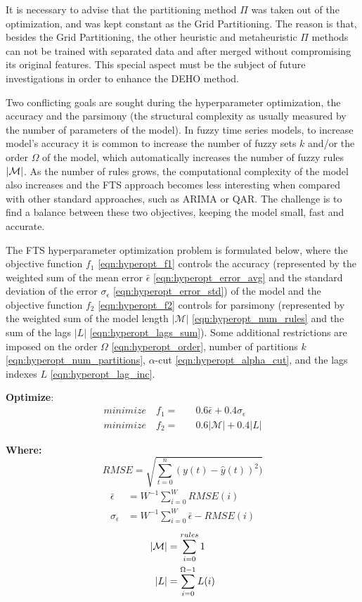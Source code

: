 It is necessary to advise that the partitioning method $\Pi$ was taken out of the optimization, and was kept constant as the Grid Partitioning. The reason is that, besides the Grid Partitioning, the other heuristic and metaheuristic $\Pi$ methods can not be trained with separated data and after merged without compromising its original features. This special aspect must be the subject of future investigations in order to enhance the DEHO method.

Two conflicting goals are sought during the hyperparameter optimization, the accuracy and the parsimony (the structural complexity as usually measured by the number of parameters of the model). In fuzzy time series models, to increase model's accuracy  it is common to increase the number of fuzzy sets $k$ and/or the order $\Omega$ of the model, which automatically increases the number of fuzzy rules $|\mathcal{M}|$. As the number of rules grows, the computational complexity of the model also increases and the FTS approach becomes less interesting when compared with other standard approaches, such as ARIMA or QAR. The challenge is to find a balance between these two objectives, keeping the model small, fast and accurate.

The FTS hyperparameter optimization problem is formulated below, where the objective function $f_1$ \eqref{eqn:hyperopt_f1} controls the accuracy (represented by the weighted sum of the mean error $\bar{\epsilon}$ \eqref{eqn:hyperopt_error_avg} and the standard deviation of the error $\sigma_\epsilon$ \eqref{eqn:hyperopt_error_std}) of the model and the objective function $f_2$ \eqref{eqn:hyperopt_f2} controls for parsimony (represented by the weighted sum of the model length $|\mathcal{M}|$ \eqref{eqn:hyperopt_num_rules} and the sum of the lags $|L|$ \eqref{eqn:hyperopt_lags_sum}). Some additional restrictions are imposed on the order $\Omega$ \eqref{eqn:hyperopt_order}, number of partitions $k$ \eqref{eqn:hyperopt_num_partitions}, $\alpha$-cut \eqref{eqn:hyperopt_alpha_cut}, and the lags indexes $L$ \eqref{eqn:hyperopt_lag_inc}. 

\textbf{Optimize}:
\begin{align}
minimize \quad  f_1  = & \quad 0.6\bar{\epsilon} + 0.4\sigma_\epsilon \label{eqn:hyperopt_f1}\\
minimize \quad  f_2  = & \quad 0.6|\mathcal{M}| + 0.4|L|  \label{eqn:hyperopt_f2}
\end{align}

\textbf{Where:}
\begin{equation}
RMSE = \sqrt{\sum_{t=0}^n (y(t) - \hat{y}(t))^2 )}
 \label{eqn:hyperopt_rmse}
\end{equation}
\begin{align}
\bar{\epsilon} & =  W^{-1}\sum_{i=0}^W RMSE(i) \label{eqn:hyperopt_error_avg} \\
\sigma_\epsilon & =  W^{-1}\sum_{i=0}^W \bar{\epsilon} - RMSE(i)  \label{eqn:hyperopt_error_std}
\end{align}
\begin{align}
|\mathcal{M}| &= \sum_{i=0}^{rules} 1  \label{eqn:hyperopt_num_rules} \\
|L| &= \sum_{i=0}^{\Omega-1} L(i)  \label{eqn:hyperopt_lags_sum} 
\end{align}

